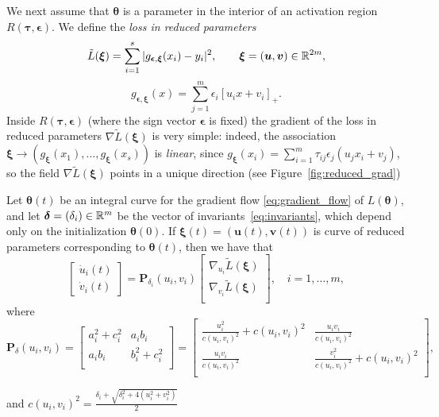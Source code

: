 We next assume that $\bm \theta$ is a parameter in the interior of an activation region $R(\bm \tau, \bm \epsilon)$. We define the \emph{loss in reduced parameters} 
\begin{equation}
    \tilde L(\bm \xi) = \sum_{i=1}^s |g_{\bm \epsilon, \bm \xi}(x_i) - y_i|^2, \qquad \bm \xi = (\bm u, \bm v) \in \mathbb{R}^{2m},  
\end{equation}
\begin{equation}
    g_{\bm \epsilon,\bm \xi}(x) = \sum_{j=1}^m \epsilon_i [ u_i x + v_i]_+.
\end{equation}
Inside $R(\bm \tau,\bm \epsilon)$ (where the sign vector $\bm \epsilon$ is fixed) the gradient of the loss in reduced parameters $\nabla \tilde L(\bm \xi)$ is very simple: indeed, the association $\bm \xi \rightarrow (g_{\bm \xi}(x_1),\ldots,g_{\bm \xi}(x_s))$ is \emph{linear}, since $g_{\bm \xi}(x_i) = \sum_{i=1}^m \tau_{ij} \epsilon_j (u_j x_i + v_j)$, so the field $\nabla \tilde L(\bm \xi)$ points in a unique direction (see Figure~\ref{fig:reduced_grad})

\begin{theorem}\label{thm:reduced_parameter_grad}
Let $\bm \theta(t)$ be an integral curve for the gradient flow \eqref{eq:gradient_flow} of $L(\bm \theta)$, and let $\bm \delta = (\delta_i) \in \mathbb{R}^m$ be the vector of invariants~\eqref{eq:invariants}, which depend only on the initialization $\bm \theta(0)$. If $\bm \xi(t) = (\bm u(t), \bm v(t))$ is curve of reduced parameters corresponding to $\bm \theta(t)$, then we have that
\begin{equation}
\begin{bmatrix}
\dot u_i(t)\\
\dot v_i(t)
\end{bmatrix} =
\bm P_{\delta_i}(u_i,v_i)
\begin{bmatrix}
\nabla_{u_i} \tilde L (\bm \xi)\\
\nabla_{v_i} \tilde L (\bm \xi)\\
\end{bmatrix},
\quad i=1,\ldots,m,
\end{equation}
where
\begin{equation}\label{eq:neuron_kernel}
\bm P_\delta(u_i,v_i) = \begin{bmatrix}
    a_i^2 + c_i^2  & 
    a_i b_i        \\
    a_i b_i               & 
    b_i^2 + c_i^2\\
\end{bmatrix} = 
\begin{bmatrix}
\frac{u_i^2}{c(u_i, v_i)^2} + c(u_i, v_i)^2 & \frac{u_i v_i}{c(u_i, v_i)^2}\\
\frac{u_i v_i}{c(u_i, v_i)^2} &  \frac{v_i^2}{c(u_i, v_i)^2} + c(u_i, v_i)^2\\
\end{bmatrix},
\end{equation}

and $c(u_i, v_i)^2 = \frac{\delta_i + \sqrt{\delta_i^2 + 4 (u_i^2 + v_i^2)}}{2}$
\end{theorem}




